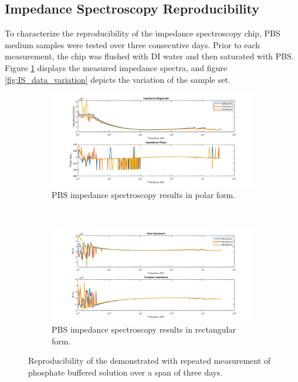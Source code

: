\FloatBarrier

\clearpage

\subsection{Impedance Spectroscopy Reproducibility}

\par To characterize the reproducibility of the impedance spectroscopy chip, PBS medium samples were tested over three consecutive days. Prior to each measurement, the chip was flushed with DI water and then saturated with PBS. Figure \ref{fig:IS_data_reproducibility} displays the measured impedance spectra, and figure \ref{fig:IS_data_variation} depicts the variation of the sample set. 

\begin{figure}[h]
    \centering
    \begin{subfigure}[b]{\textwidth}
        \centering
        \includegraphics[width=\textwidth]{images/reproducibility_PBS_mag_phase.png}
        \caption{PBS impedance spectroscopy results in polar form.}
    \end{subfigure}
    \\
    \vspace{0.1 in}
    \begin{subfigure}[b]{\textwidth}
        \centering
        \includegraphics[width=\textwidth]{images/reproducibility_PBS_real_imag.png}
        \caption{PBS impedance spectroscopy results in rectangular form.}
    \end{subfigure}
    \caption{Reproducibility of the demonstrated with repeated measurement of phosphate buffered solution over a span of three days.}
    \label{fig:IS_data_reproducibility}
\end{figure}

